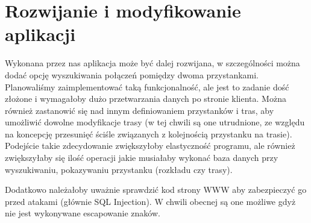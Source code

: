 \section{Rozwijanie i modyfikowanie aplikacji}
Wykonana przez nas aplikacja może być dalej rozwijana, w szczególności można dodać opcję wyszukiwania połączeń pomiędzy dwoma przystankami. Planowaliśmy zaimplementować
taką funkcjonalność, ale jest to zadanie dość złożone i wymagałoby dużo przetwarzania danych po stronie klienta. Można również zastanowić się nad innym 
definiowaniem przystanków i tras, aby umożliwić dowolne modyfikacje trasy (w tej chwili są one utrudnione, ze względu na koncepcję przesunięć ściśle związanych z kolejnością przystanku na trasie).
Podejście takie zdecydowanie zwiększyłoby elastyczność programu, ale również zwiększyłaby się ilość operacji jakie musiałaby wykonać baza danych przy wyszukiwaniu,
 pokazywaniu przystanku (rozkładu czy trasy). 

Dodatkowo należałoby uważnie sprawdzić kod strony WWW aby zabezpieczyć go przed atakami (głównie SQL Injection). W chwili obecnej są one możliwe gdyż nie jest wykonywane escapowanie znaków.